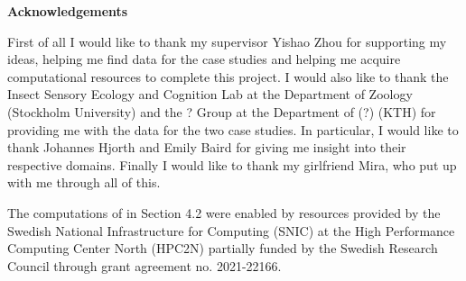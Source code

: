 \newenvironment{acknowledgements}%
    {\cleardoublepage\thispagestyle{empty}\null\vfill\begin{center}%
    \bfseries Acknowledgements\end{center}}%
    {\vfill\null}
        \begin{acknowledgements}
          First of all I would like to thank my supervisor Yishao Zhou for supporting my ideas, helping me find data for the case studies and helping me acquire computational resources to complete this project. I would also  like to thank the Insect Sensory Ecology and Cognition Lab at the Department of Zoology (Stockholm University) and the ? Group at the Department of (?) (KTH) for providing me with the data for the two case studies. In particular, I would like to thank Johannes Hjorth and Emily Baird for giving me insight into their respective domains. Finally I would like to thank my girlfriend Mira, who put up with me through all of this.

          The computations of in Section 4.2 were enabled by resources provided by the Swedish National Infrastructure for Computing (SNIC) at the High Performance Computing Center North (HPC2N) partially funded by the Swedish Research Council through grant agreement no. 2021-22166.
        \end{acknowledgements}
